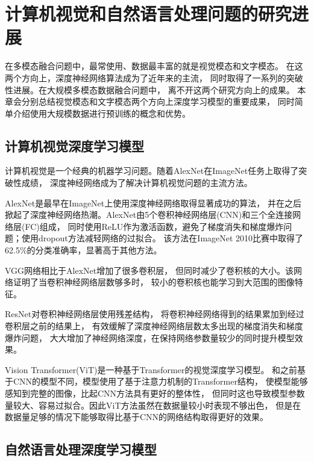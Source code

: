 \chapter{计算机视觉和自然语言处理问题的研究进展}\label{chap:related}

在多模态融合问题中，最常使用、数据最丰富的就是视觉模态和文字模态。
在这两个方向上，深度神经网络算法成为了近年来的主流，
同时取得了一系列的突破性进展。在大规模多模态数据融合问题中，
离不开这两个研究方向上的成果。
本章会分别总结视觉模态和文字模态两个方向上深度学习模型的重要成果，
同时简单介绍使用大规模数据进行预训练的概念和优势。

\section{计算机视觉深度学习模型}\label{sec:cvmodel}

计算机视觉是一个经典的机器学习问题。随着AlexNet在ImageNet任务上取得了突破性成绩，
深度神经网络成为了解决计算机视觉问题的主流方法。

AlexNet\cite{krizhevsky2012imagenet}是最早在ImageNet上使用深度神经网络取得显著成功的算法，
并在之后掀起了深度神经网络热潮。AlexNet由5个卷积神经网络层(CNN)和三个全连接网络层(FC)组成，
同时使用ReLU作为激活函数，避免了梯度消失和梯度爆炸问题；使用dropout方法减轻网络的过拟合。
该方法在ImageNet 2010比赛中取得了62.5\%的分类准确率，显著高于其他方法。

VGG网络\cite{simonyan2015deep}相比于AlexNet增加了很多卷积层，
但同时减少了卷积核的大小。该网络证明了当卷积神经网络层数够多时，
较小的卷积核也能学习到大范围的图像特征。

ResNet\cite{he2015deep}对卷积神经网络层使用残差结构，
将卷积神经网络得到的结果累加到经过卷积层之前的结果上，
有效缓解了深度神经网络层数太多出现的梯度消失和梯度爆炸问题，
大大增加了神经网络深度，在保持网络参数量较少的同时提升模型效果。

Vision Transformer(ViT)\cite{dosovitskiy2020image}是一种基于Transformer的视觉深度学习模型。
和之前基于CNN的模型不同，模型使用了基于注意力机制的Transformer结构，
使模型能够感知到完整的图像，比起CNN方法具有更好的整体性，
但同时这也导致模型参数量较大、容易过拟合。因此ViT方法虽然在数据量较小时表现不够出色，
但是在数据量足够的情况下能够取得比基于CNN的网络结构取得更好的效果。

\section{自然语言处理深度学习模型}\label{sec:cvmodel}


